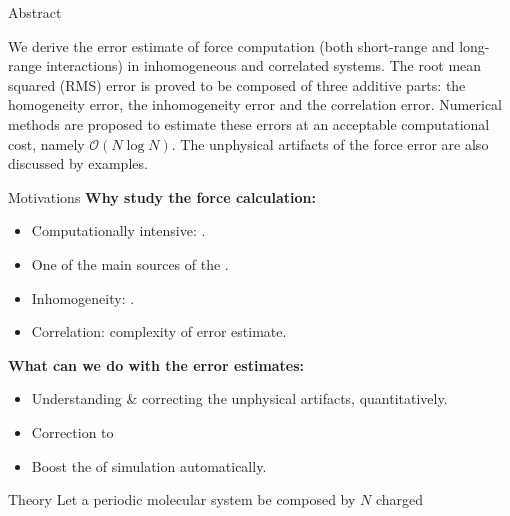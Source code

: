 \documentclass[final,hyperref={pdfpagelabels=false},fleqn]{beamer}
\begin{document}
\begin{frame}{}
  
  \vfill
  \begin{columns}[t]
    \begin{column}{.48\linewidth}
      \vfill
      \begin{block}{\large Abstract}
        \vspace{1ex}
        \begin{minipage}[c]{.975\linewidth}
          We derive the error estimate of force computation (both short-range
          and long-range interactions) in inhomogeneous and correlated systems.
          The root mean squared (RMS) error is proved to be composed of
          three additive parts: the homogeneity error, the inhomogeneity error
          and the correlation error. Numerical methods are proposed to
          estimate these errors at an acceptable computational cost, namely
          $\mathcal O(N\log N)$. The unphysical artifacts of the force error
          are also discussed by examples.
        \end{minipage}
      \end{block}
      \vspace{.3ex}
      \begin{block}{Motivations}
        \textbf{Why study the force calculation:}
        \begin{itemize}
        \item Computationally intensive: .
        \item One of the main sources of the .
        \item Inhomogeneity: .
        \item Correlation: complexity of error estimate.
        \end{itemize}
        \textbf{What can we do with the error estimates:}
        \begin{itemize}
        \item Understanding \& correcting
          the unphysical artifacts, quantitatively.
        \item Correction to 
        \item Boost the  of simulation automatically.
        \end{itemize}
      \end{block}
      \vspace{.3ex}
      \begin{block}{Theory}
        Let a periodic molecular system be composed by $N$ charged

\end{block}
\end{column}
\end{columns}
\end{frame}
\end{document}
